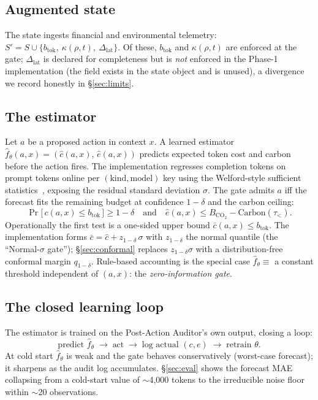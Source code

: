\documentclass[11pt]{article}
\theoremstyle{plain}
\theoremstyle{definition}
\theoremstyle{remark}
\newcommand{\btok}{b_{\mathrm{tok}}}
\newcommand{\Carbon}{\mathrm{Carbon}}
\begin{document}
\subsection{Augmented state}
The state ingests financial and environmental telemetry: $S' = S \cup \{\btok,\ \kappa(\rho,t),\ \Delta_{\mathrm{lat}}\}$. Of these, $\btok$ and $\kappa(\rho,t)$ are enforced at the gate; $\Delta_{\mathrm{lat}}$ is declared for completeness but is \emph{not} enforced in the Phase-1 implementation (the field exists in the state object and is unused), a divergence we record honestly in \S\ref{sec:limits}.

\subsection{The estimator}
Let $a$ be a proposed action in context $x$. A learned estimator $\hat f_\theta(a,x) = (\hat c(a,x),\, \hat e(a,x))$ predicts expected token cost and carbon before the action fires. The implementation regresses completion tokens on prompt tokens online per $(\text{kind},\text{model})$ key using the Welford-style sufficient statistics~\cite{welford1962}, exposing the residual standard deviation $\sigma$. The gate admits $a$ iff the forecast fits the remaining budget at confidence $1-\delta$ and the carbon ceiling:
\begin{equation}
\Pr\!\big[\,c(a,x) \le \btok \,\big] \ge 1-\delta
\quad\text{and}\quad
\hat e(a,x) \le B_{\mathrm{CO_2}} - \Carbon(\tau_{<}).
\end{equation}
Operationally the first test is a one-sided upper bound $\bar c(a,x) \le \btok$. The implementation forms $\bar c = \hat c + z_{1-\delta}\,\sigma$ with $z_{1-\delta}$ the normal quantile (the ``Normal-$\sigma$ gate''); \S\ref{sec:conformal} replaces $z_{1-\delta}\sigma$ with a distribution-free conformal margin $q_{1-\delta}$. Rule-based accounting is the special case $\hat f_\theta \equiv$ a constant threshold independent of $(a,x)$: the \emph{zero-information gate}.

\subsection{The closed learning loop}
The estimator is trained on the Post-Action Auditor's own output, closing a loop:
\begin{equation}
\text{predict } \hat f_\theta \;\longrightarrow\; \text{act} \;\longrightarrow\; \text{log actual } (c,e) \;\longrightarrow\; \text{retrain } \theta .
\end{equation}
At cold start $\hat f_\theta$ is weak and the gate behaves conservatively (worst-case forecast); it sharpens as the audit log accumulates. \S\ref{sec:eval} shows the forecast MAE collapsing from a cold-start value of $\sim$4{,}000 tokens to the irreducible noise floor within $\sim$20 observations.
\end{document}
